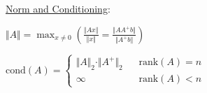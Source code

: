 \documentclass[12pt]{article}
\begin{document}
\vspace{10pt}
\underline{Norm and Conditioning}:\\[10pt]
\begin{minipage}[t]{.49\textwidth}
	\(\boxed{ \Vert A \Vert = \max_{x \neq 0} \left( \frac{\Vert Ax \Vert}{\Vert x \Vert} 
	= \frac{\Vert AA^+ b \Vert}{\Vert A^+ b \Vert} \right) }\)
\end{minipage}
\begin{minipage}[t]{.49\textwidth}
	\(\boxed{ \text{cond}(A) = \begin{cases}
		\Vert A \Vert_2 \cdot \Vert A^+ \Vert_2 & \hspace{10pt} \text{rank}(A) = n\\
		\infty & \hspace{10pt} \text{rank}(A) < n
	\end{cases} }\)
\end{minipage}
\end{document}
